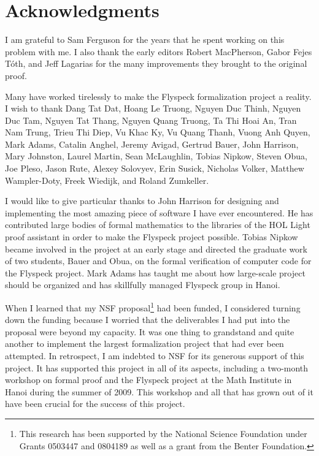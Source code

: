 

\section*{Acknowledgments}


I am grateful to Sam Ferguson for the years that he spent working on
this problem with me.  I also thank the early editors Robert
MacPherson, Gabor Fejes T\'oth, and Jeff Lagarias for the many
improvements they brought to the original proof.

Many have worked tirelessly to make the Flyspeck formalization project
a reality.  I wish to thank 
Dang Tat Dat, 
Hoang Le Truong,
Nguyen Duc Thinh,  
Nguyen Duc Tam, 
Nguyen Tat Thang,
Nguyen Quang Truong, 
Ta Thi Hoai An, 
Tran Nam Trung, 
Trieu Thi Diep, 
Vu Khac Ky, 
Vu Quang Thanh,
Vuong Anh Quyen,
% 
Mark Adams,
Catalin Anghel, 
Jeremy Avigad, 
Gertrud Bauer, 
%
John Harrison, 
Mary Johnston, 
Laurel %
Martin, 
Sean McLaughlin, 
Tobias Nipkow, 
Steven Obua, 
Joe Pleso, 
%
Jason Rute,
Alexey Solovyev,
Erin Susick,
Nicholas Volker, 
Matthew Wampler-Doty, 
 Freek Wiedijk, 
and Roland Zumkeller.

I would like to give particular thanks 
to John Harrison for designing and implementing the
most amazing piece of software I have ever encountered.  He has
contributed large bodies of formal mathematics to the libraries of the
HOL Light proof assistant in order to make the Flyspeck project
possible.  Tobias Nipkow became involved in the project at an early
stage and directed the graduate work of two students, Bauer and Obua,
on the formal verification of computer code for the Flyspeck
project. Mark Adams has taught me about how large-scale project should
be organized and has skillfully managed Flyspeck group in Hanoi.

When I learned that my NSF proposal\footnote{This research has been 
supported by the National Science Foundation
under Grants 0503447 and 0804189 as well as a grant from the Benter
Foundation.}
had been funded, I considered
turning down the funding because I worried that the deliverables I had
put into the proposal were beyond my capacity.  It was one thing to
grandstand and quite another to implement the largest formalization
project that had ever been attempted.  In retrospect, I am indebted to
NSF for its generous support of this project.  It has supported this
project in all of its aspects, including a two-month workshop on
formal proof and the Flyspeck project at the Math Institute in Hanoi
during the summer of 2009.  This workshop and all that has grown out
of it have been crucial for the success of this project.

